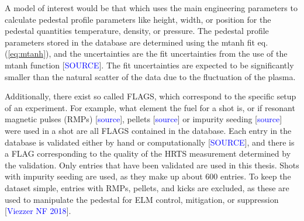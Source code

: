 \documentclass[a4paper, twoside, final, 12pt]{article}
\begin{document}

A model of interest would be that which uses the main engineering parameters to calculate pedestal profile parameters like height, width, or position for the pedestal quantities temperature, density, or pressure.
The pedestal profile parameters stored in the database are determined using the mtanh fit eq.\;(\ref{eq:mtanh}), and the uncertainties are the fit uncertainties from the use of the mtanh function [\textcolor{blue}{SOURCE}].
The fit uncertainties are expected to be significantly smaller than the natural scatter of the data due to the fluctuation of the plasma.

Additionally, there exist so called FLAGS, which correspond to the specific setup of an experiment.
For example, what element the fuel for a shot is, or if resonant magnetic pulses (RMPs) [\textcolor{blue}{source}], pellets [\textcolor{blue}{source}] or impurity seeding [\textcolor{blue}{source}] were used in a shot are all FLAGS contained in the database.
Each entry in the database is validated either by hand or computationally [\textcolor{blue}{SOURCE}], and there is a FLAG corresponding to the quality of the HRTS measurement determined by the validation.
Only entries that have been validated are used in this thesis.
Shots with impurity seeding are used, as they make up about 600 entries.
To keep the dataset simple, entries with RMPs, pellets, and kicks are excluded, as these are used to manipulate the pedestal for ELM control, mitigation, or suppression [\textcolor{blue}{Viezzer NF 2018}].
\end{document}
